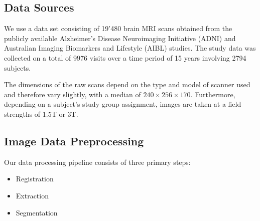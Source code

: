\subsection{Data Sources}
We use a data set consisting of 19'480 brain MRI scans obtained from the publicly available Alzheimer's Disease Neuroimaging Initiative (ADNI) \cite{jack2008alzheimer} and Australian Imaging Biomarkers and Lifestyle (AIBL) \cite{ellis2009australian} studies. The study data was collected on a total of 9976 visits over a time period of 15 years involving 2794 subjects.

The dimensions of the raw scans depend on the type and model of scanner used and therefore vary slightly, with a median of $ 240 \times 256 \times 170 $. Furthermore, depending on a subject's study group assignment, images are taken at a field strengths of 1.5T or 3T.

\subsection{Image Data Preprocessing}
\label{sec:datpreproc}
Our data processing pipeline consists of three primary steps:

\begin{itemize}
\item Registration
\item Extraction
\item Segmentation
\end{itemize}

